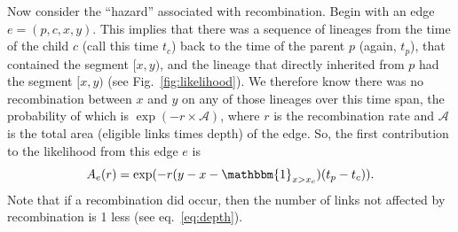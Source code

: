 \documentclass{article}
\begin{document}
Now consider the ``hazard'' associated with recombination.
Begin with an edge $e = (p,c,x,y)$.
This implies that there was a sequence of lineages
from the time of the child $c$ (call this time $t_c$)
back to the time of the parent $p$ (again, $t_p$),
that contained the segment $[x,y)$,
and the lineage that directly inherited from $p$
had the segment $[x,y)$ (see Fig.~\ref{fig:likelihood}).
We therefore know there was no recombination between $x$ and $y$
on any of those lineages 
over this time span,
the probability of which is
$\exp(-r \times \mathcal{A})$, where $r$ is the recombination rate
and $\mathcal{A}$ is the total area (eligible links times depth) of the edge.
So, the first contribution to the likelihood from this edge $e$ is
\begin{equation}\label{eq:span}
A_e(r) = \exp(-r (y-x - \mathbbm{1}_{x > x_c})(t_p - t_{c})) .
\end{equation}
Note that if a recombination did occur, then the number of links not
affected by recombination is 1 less (see eq.~\eqref{eq:depth}).
\end{document}
